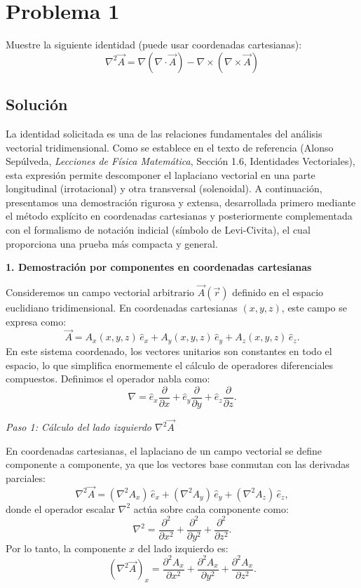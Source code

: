 \documentclass[a4paper]{article}
\begin{document}
\section{Problema 1}
Muestre la siguiente identidad (puede usar coordenadas cartesianas):
$$
\nabla^2 \vec{A} = \nabla(\nabla \cdot \vec{A}) - \nabla \times (\nabla \times \vec{A})
$$

\subsection{Solución}
La identidad solicitada es una de las relaciones fundamentales del análisis vectorial tridimensional. Como se establece en el texto de referencia (Alonso Sepúlveda, \textit{Lecciones de Física Matemática}, Sección 1.6, Identidades Vectoriales), esta expresión permite descomponer el laplaciano vectorial en una parte longitudinal (irrotacional) y otra transversal (solenoidal). A continuación, presentamos una demostración rigurosa y extensa, desarrollada primero mediante el método explícito en coordenadas cartesianas y posteriormente complementada con el formalismo de notación indicial (símbolo de Levi-Civita), el cual proporciona una prueba más compacta y general.

\vspace{0.3cm}
\noindent\textbf{1. Demostración por componentes en coordenadas cartesianas}

Consideremos un campo vectorial arbitrario $\vec{A}(\vec{r})$ definido en el espacio euclidiano tridimensional. En coordenadas cartesianas $(x, y, z)$, este campo se expresa como:
$$
\vec{A} = A_x(x,y,z)\,\hat{e}_x + A_y(x,y,z)\,\hat{e}_y + A_z(x,y,z)\,\hat{e}_z.
$$
En este sistema coordenado, los vectores unitarios son constantes en todo el espacio, lo que simplifica enormemente el cálculo de operadores diferenciales compuestos. Definimos el operador nabla como:
$$
\nabla = \hat{e}_x \frac{\partial}{\partial x} + \hat{e}_y \frac{\partial}{\partial y} + \hat{e}_z \frac{\partial}{\partial z}.
$$

\noindent\textit{Paso 1: Cálculo del lado izquierdo $\nabla^2 \vec{A}$}

En coordenadas cartesianas, el laplaciano de un campo vectorial se define componente a componente, ya que los vectores base conmutan con las derivadas parciales:
$$
\nabla^2 \vec{A} = (\nabla^2 A_x)\,\hat{e}_x + (\nabla^2 A_y)\,\hat{e}_y + (\nabla^2 A_z)\,\hat{e}_z,
$$
donde el operador escalar $\nabla^2$ actúa sobre cada componente como:
$$
\nabla^2 = \frac{\partial^2}{\partial x^2} + \frac{\partial^2}{\partial y^2} + \frac{\partial^2}{\partial z^2}.
$$
Por lo tanto, la componente $x$ del lado izquierdo es:
$$
(\nabla^2 \vec{A})_x = \frac{\partial^2 A_x}{\partial x^2} + \frac{\partial^2 A_x}{\partial y^2} + \frac{\partial^2 A_x}{\partial z^2}.
$$
\end{document}
